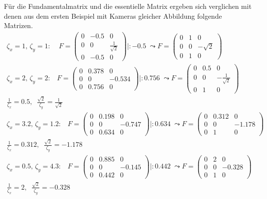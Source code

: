 Für die Fundamentalmatrix und die essentielle Matrix ergeben sich verglichen mit denen aus dem ersten Beispiel mit Kameras gleicher Abbildung folgende Matrizen.\\


\begin{gather*}
	\zeta_x = 1, \, \zeta_y = 1: \; \; \;\;
	F = \begin{pmatrix}
			0&-0.5&0\\
			0&0&\frac{1}{\sqrt{2}}\\
			0&-0.5&0
		\end{pmatrix} |: -0.5 \; \leadsto
	F=\begin{pmatrix}
		0&1&0\\
		0&0&-\sqrt{2}\\
		0&1&0
	\end{pmatrix}\\	
	\zeta_x = 2, \, \zeta_y = 2: \; \; \;
	F = \begin{pmatrix}
		0&0.378&0\\
		0&0&-0.534\\
		0&0.756&0
	\end{pmatrix} |: 0.756 \; \leadsto
	F=\begin{pmatrix}
		0&0.5&0\\
		0&0&-\frac{1}{\sqrt{2}}\\
		0&1&0
	\end{pmatrix}\\ \frac{1}{\zeta_x} = 0.5, \;\; \frac{\sqrt{2}}{\zeta_y} = \frac{1}{\sqrt{2}}\\
	\zeta_x = 3.2, \, \zeta_y = 1.2: \; \; \;
F = \begin{pmatrix}
	0&0.198&0\\
	0&0&-0.747\\
	0&0.634&0
\end{pmatrix} |: 0.634 \; \leadsto
F=\begin{pmatrix}
	0&0.312&0\\
	0&0&-1.178\\
	0&1&0
\end{pmatrix}\\ \frac{1}{\zeta_x} = 0.312, \;\; \frac{\sqrt{2}}{\zeta_y} = -1.178\\
	\zeta_x = 0.5, \, \zeta_y = 4.3: \; \; \;
F = \begin{pmatrix}
	0&0.885&0\\
	0&0&-0.145\\
	0&0.442&0
\end{pmatrix} |: 0.442 \; \leadsto
F=\begin{pmatrix}
	0&2&0\\
	0&0&-0.328\\
	0&1&0
\end{pmatrix}\\ \frac{1}{\zeta_x} =2, \;\; \frac{\sqrt{2}}{\zeta_y} = -0.328
\end{gather*}\\


